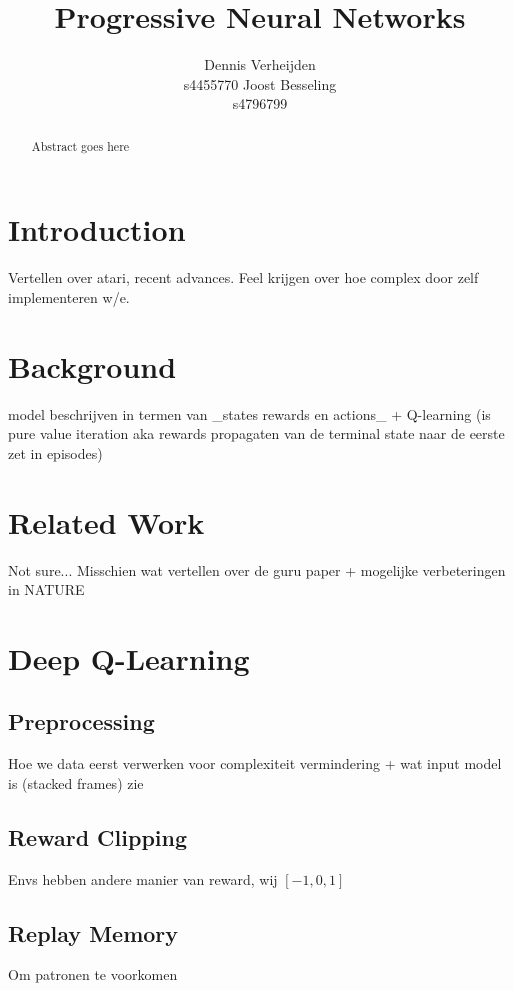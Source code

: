 \documentclass{article}
\title{Progressive Neural Networks}
\author{
  Dennis Verheijden\\
  s4455770
    \And
  Joost Besseling\\
  s4796799
}
\begin{document}

\maketitle

\begin{abstract}
  Abstract goes here
\end{abstract}

\section{Introduction}
Vertellen over atari, recent advances. Feel krijgen over hoe complex door zelf implementeren w/e.

\section{Background}
model beschrijven in termen van _states rewards en actions_ + Q-learning (is pure value iteration aka rewards propagaten van de terminal state naar de eerste zet in episodes)

\section{Related Work}
Not sure... Misschien wat vertellen over de guru paper \cite{mnih2013playing} + mogelijke verbeteringen in NATURE \cite{mnih2015human}

\section{Deep Q-Learning}

\subsection{Preprocessing}
Hoe we data eerst verwerken voor complexiteit vermindering + wat input model is (stacked frames) zie \cite{mnih2013playing}

\subsection{Reward Clipping}
Envs hebben andere manier van reward, wij $[-1, 0, 1]$

\subsection{Replay Memory}
Om patronen te voorkomen \cite{mnih2013playing}
\end{document}
